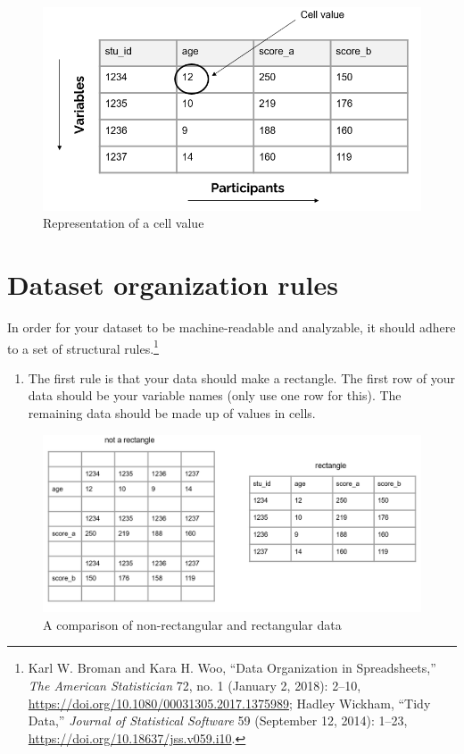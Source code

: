 \documentclass[
]{book}
\providecommand{\tightlist}{%
  \setlength{\itemsep}{0pt}\setlength{\parskip}{0pt}}
\begin{document}
\begin{figure}

{\centering \includegraphics[width=0.7\linewidth]{img/cell_value} 

}

\caption{Representation of a cell value}\label{fig:unnamed-chunk-2}
\end{figure}

\hypertarget{dataset-organization-rules}{%
\section{Dataset organization rules}\label{dataset-organization-rules}}

In order for your dataset to be machine-readable and analyzable, it should adhere to a set of structural rules.\footnote{Karl W. Broman and Kara H. Woo, {``Data Organization in Spreadsheets,''} \emph{The American Statistician} 72, no. 1 (January 2, 2018): 2--10, \url{https://doi.org/10.1080/00031305.2017.1375989}; Hadley Wickham, {``Tidy Data,''} \emph{Journal of Statistical Software} 59 (September 12, 2014): 1--23, \url{https://doi.org/10.18637/jss.v059.i10}.}

\begin{enumerate}
\def\labelenumi{\arabic{enumi}.}
\tightlist
\item
  The first rule is that your data should make a rectangle. The first row of your data should be your variable names (only use one row for this). The remaining data should be made up of values in cells.
\end{enumerate}

\begin{figure}

{\centering \includegraphics[width=1\linewidth]{img/rectangle2} 

}

\caption{A comparison of non-rectangular and rectangular data}\label{fig:unnamed-chunk-3}
\end{figure}
\end{document}
